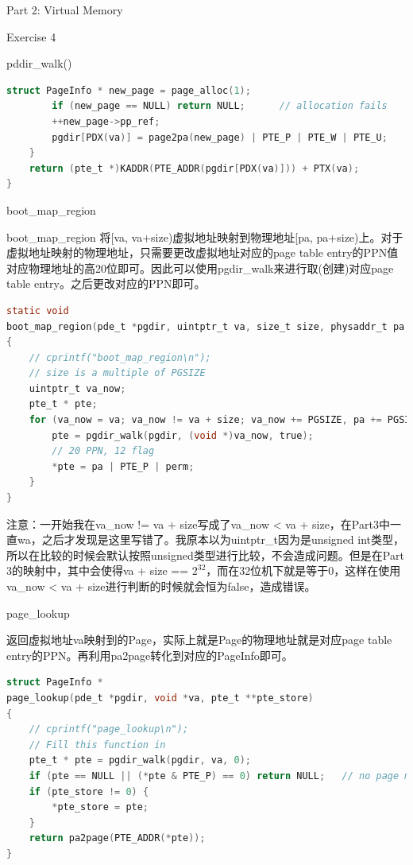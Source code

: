 \documentclass[GBK,winfonts,a4paper,10pt]{ctexart}
\begin{document}
\begin{section}{Part 2: Virtual Memory}
\begin{subsection}{Exercise 4}
\begin{subsubsection}{pddir\_walk()}
\begin{lstlisting}[language=C]
        struct PageInfo * new_page = page_alloc(1);
        if (new_page == NULL) return NULL;      // allocation fails
        ++new_page->pp_ref;
        pgdir[PDX(va)] = page2pa(new_page) | PTE_P | PTE_W | PTE_U;
    }
    return (pte_t *)KADDR(PTE_ADDR(pgdir[PDX(va)])) + PTX(va);
}
\end{lstlisting}
\end{subsubsection}

\begin{subsubsection}{boot\_map\_region}
\par
boot\_map\_region 将[va, va+size)虚拟地址映射到物理地址[pa, pa+size)上。对于虚拟地址映射的物理地址，只需要更改虚拟地址对应的page table entry的PPN值对应物理地址的高20位即可。因此可以使用pgdir\_walk来进行取(创建)对应page table entry。之后更改对应的PPN即可。
\begin{lstlisting}[language=C]
static void
boot_map_region(pde_t *pgdir, uintptr_t va, size_t size, physaddr_t pa, int perm)
{
    // cprintf("boot_map_region\n");
	// size is a multiple of PGSIZE
    uintptr_t va_now;
    pte_t * pte;
    for (va_now = va; va_now != va + size; va_now += PGSIZE, pa += PGSIZE) {
        pte = pgdir_walk(pgdir, (void *)va_now, true);
        // 20 PPN, 12 flag
        *pte = pa | PTE_P | perm;
    }
}
\end{lstlisting}
\par
注意：一开始我在va\_now != va + size写成了va\_now < va + size，在Part3中一直wa，之后才发现是这里写错了。我原本以为uintptr\_t因为是unsigned int类型，所以在比较的时候会默认按照unsigned类型进行比较，不会造成问题。但是在Part 3的映射中，其中会使得va + size == $2^{32}$，而在32位机下就是等于0，这样在使用va\_now < va + size进行判断的时候就会恒为false，造成错误。
\end{subsubsection}

\begin{subsubsection}{page\_lookup}
\par
返回虚拟地址va映射到的Page，实际上就是Page的物理地址就是对应page table entry的PPN。再利用pa2page转化到对应的PageInfo即可。
\begin{lstlisting}[language=C]
struct PageInfo *
page_lookup(pde_t *pgdir, void *va, pte_t **pte_store)
{
    // cprintf("page_lookup\n");
	// Fill this function in
    pte_t * pte = pgdir_walk(pgdir, va, 0);
    if (pte == NULL || (*pte & PTE_P) == 0) return NULL;   // no page mapped at va
    if (pte_store != 0) {
        *pte_store = pte;
    }
    return pa2page(PTE_ADDR(*pte));
}
\end{lstlisting}
\end{subsubsection}


\end{subsection}
\end{section}
\end{document}
